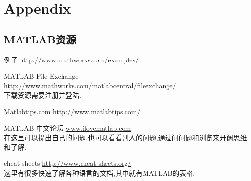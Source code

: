 \appendix
\section{Appendix}

\subsection{MATLAB资源}
\begin{itemize*}
	\item 例子 \url{http://www.mathworks.com/examples/}
    \item MATLAB File Exchange 
                      \url{http://www.mathworks.com/matlabcentral/fileexchange/}\\
          下载资源需要注册并登陆.
    \item Matlabtips.com \url{http://www.matlabtips.com/}
    \item MATLAB 中文论坛 \url{www.ilovematlab.com}\\
          在这里可以提出自己的问题,也可以看看别人的问题,通过问问题和浏览来开阔思维和了解.                  
    \item cheat-sheets \url{http://www.cheat-sheets.org/}\\
          这里有很多快速了解各种语言的文档,其中就有MATLAB的表格.
\end{itemize*}